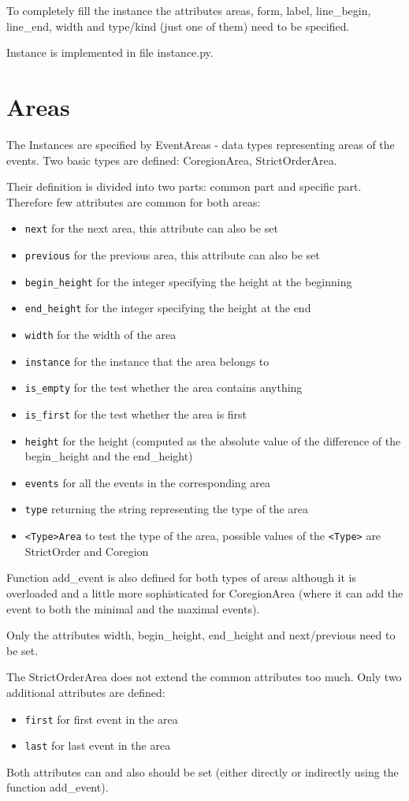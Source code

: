 \documentclass[11pt,oneside]{fithesis2}
\newcommand{\T}[1]{\texttt{#1}}
\newcommand{\ite}[1]{\item{\texttt{#1}}}
\begin{document}
To completely fill the instance the attributes areas, form, label, line\_begin, line\_end, width and type/kind (just one of them) need to be specified.

Instance is implemented in file instance.py.


\section{Areas}
The Instances are specified by EventAreas - data types representing areas of the events. Two basic types are defined: CoregionArea, StrictOrderArea.

Their definition is divided into two parts: common part and specific part. Therefore few attributes are common for both areas:
\begin{itemize}
\ite{next} for the next area, this attribute can also be set
\ite{previous} for the previous area, this attribute can also be set
\ite{begin\_height} for the integer specifying the height at the beginning
\ite{end\_height} for the integer specifying the height at the end
\ite{width} for the width of the area
\ite{instance} for the instance that the area belongs to
\ite{is\_empty} for the test whether the area contains anything
\ite{is\_first} for the test whether the area is first
\ite{height} for the height (computed as the absolute value of the difference of the begin\_height and the end\_height)
\ite{events} for all the events in the corresponding area
\ite{type} returning the string representing the type of the area
\ite{<Type>Area} to test the type of the area, possible values of the \T{<Type>} are StrictOrder and Coregion
\end{itemize}

Function add\_event is also defined for both types of areas although it is overloaded and a little more sophisticated for CoregionArea (where it can add the event to both the minimal and the maximal events).

Only the attributes width, begin\_height, end\_height and next/previous need to be set.

The StrictOrderArea does not extend the common attributes too much. Only two additional attributes are defined:
\begin{itemize}
\ite{first} for first event in the area
\ite{last} for last event in the area
\end{itemize}

Both attributes can and also should be set (either directly or indirectly using the function add\_event).
\end{document}
